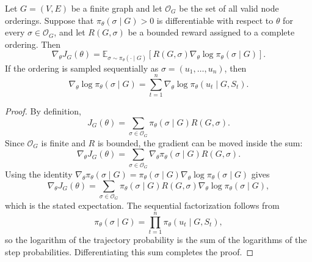 \begin{theorem}
\label{thm:policy-gradient-ordering}
Let $G=(V,E)$ be a finite graph and let $\mathcal{O}_G$ be the set of all valid node orderings. Suppose that $\pi_\theta(\sigma\mid G)>0$ is differentiable with respect to $\theta$ for every $\sigma\in\mathcal{O}_G$, and let $R(G,\sigma)$ be a bounded reward assigned to a complete ordering. Then
\begin{equation}
    \nabla_\theta J_G(\theta)
    = \mathbb{E}_{\sigma\sim\pi_\theta(\cdot\mid G)}
    \left[ R(G,\sigma)\nabla_\theta\log \pi_\theta(\sigma\mid G) \right].
\end{equation}
If the ordering is sampled sequentially as $\sigma=(u_1,\ldots,u_n)$, then
\begin{equation}
    \nabla_\theta\log \pi_\theta(\sigma\mid G)
    = \sum_{t=1}^{n}\nabla_\theta\log \pi_\theta(u_t\mid G,S_t).
\end{equation}
\end{theorem}

\begin{proof}
By definition,
\begin{equation}
    J_G(\theta)=\sum_{\sigma\in\mathcal{O}_G}\pi_\theta(\sigma\mid G)R(G,\sigma).
\end{equation}
Since $\mathcal{O}_G$ is finite and $R$ is bounded, the gradient can be moved inside the sum:
\begin{equation}
    \nabla_\theta J_G(\theta)
    =\sum_{\sigma\in\mathcal{O}_G}\nabla_\theta\pi_\theta(\sigma\mid G)R(G,\sigma).
\end{equation}
Using the identity $\nabla_\theta\pi_\theta(\sigma\mid G)=\pi_\theta(\sigma\mid G)\nabla_\theta\log\pi_\theta(\sigma\mid G)$ gives
\begin{equation}
    \nabla_\theta J_G(\theta)
    =\sum_{\sigma\in\mathcal{O}_G}\pi_\theta(\sigma\mid G)R(G,\sigma)\nabla_\theta\log\pi_\theta(\sigma\mid G),
\end{equation}
which is the stated expectation. The sequential factorization follows from
\begin{equation}
    \pi_\theta(\sigma\mid G)=\prod_{t=1}^{n}\pi_\theta(u_t\mid G,S_t),
\end{equation}
so the logarithm of the trajectory probability is the sum of the logarithms of the step probabilities. Differentiating this sum completes the proof.
\end{proof}

